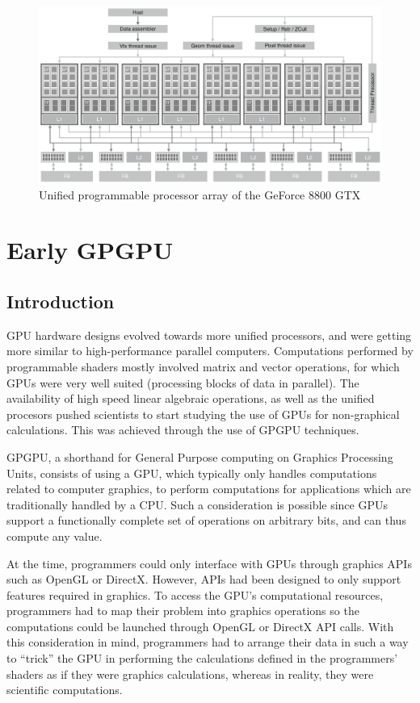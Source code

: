 \documentclass[10pt, a4paper]{report}
\begin{document}
\begin{figure}[h]
\includegraphics[width=\linewidth]{figs/unified_programmable_processor_array_of_the_GeForce_8800_GTX_graphics_pipeline}
\caption{Unified programmable processor array of the GeForce 8800 GTX}
\label{fig:unified_programmable_processor_array_of_the_GeForce_8800_GTX_graphics_pipeline}
\end{figure}

\section{Early GPGPU}
\subsection{Introduction}
GPU hardware designs evolved towards more unified processors, and were getting
more similar to high-performance parallel computers.
Computations performed by programmable shaders mostly involved matrix and vector
operations, for which GPUs were very well suited (processing blocks of data in
parallel).
The availability of high speed linear algebraic operations, as well as the
unified procesors pushed scientists to start studying the use of GPUs for
non-graphical calculations.
This was achieved through the use of GPGPU techniques.

GPGPU, a shorthand for General Purpose computing on Graphics Processing Units,
consists of using a GPU, which typically only handles computations related to
computer graphics, to perform computations for applications which are
traditionally handled by a CPU.
Such a consideration is possible since GPUs support a functionally complete set
of operations on arbitrary bits, and can thus compute any value.

At the time, programmers could only interface with GPUs through graphics APIs
such as OpenGL or DirectX.
However, APIs had been designed to only support features required in graphics.
To access the GPU's computational resources, programmers had to map their
problem into graphics operations so the computations could be launched through
OpenGL or DirectX API calls.
With this consideration in mind, programmers had to arrange their data in such a
way to ``trick'' the GPU in performing the calculations defined in the
programmers' shaders as if they were graphics calculations, whereas in reality,
they were scientific computations.
\end{document}
